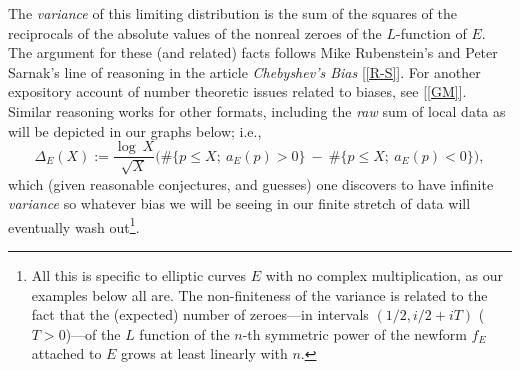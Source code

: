 \documentclass[11pt]{article}
\theoremstyle{plain}
\theoremstyle{definition}
\numberwithin{equation}{section}
\numberwithin{figure}{section}
\numberwithin{table}{section}
\begin{document}
  The {\it variance} of this limiting distribution  is the sum of the squares of the reciprocals of the absolute values of the nonreal zeroes of the $L$-function of $E$. The argument for these (and related) facts follows Mike Rubenstein's and Peter Sarnak's line of reasoning in the article {\it Chebyshev's Bias} [\ref{R-S}]. For another expository account of number theoretic issues related to biases, see [\ref{GM}]. Similar reasoning works for other formats, including the {\it raw} sum of local data as will be depicted in our graphs below; i.e.,  $$\Delta_E(X):= {\frac{\log\ X}{\sqrt X}}\big(\#\{ {p \le X};\ a_E(p) > 0\} \ - \ \#\{ {p \le X};\ a_E(p) < 0\}\big),$$ which  (given reasonable conjectures, and guesses)  one discovers to have infinite {\it variance} so whatever bias we will be seeing in our finite stretch of data will eventually wash out{\footnote{ All this is specific to elliptic curves $E$ with no complex multiplication, as our examples below all are. The non-finiteness of the variance is related to the fact that the (expected) number of  zeroes---in  intervals  $(1/2, i/2+iT)$ ($T > 0$)---of the $L$ function of the $n$-th symmetric power of the newform $f_E$ attached to  $E$   grows at least linearly with $n$.}}.






\end{document}
